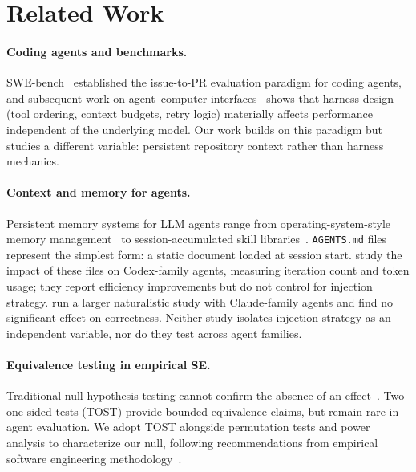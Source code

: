 \documentclass[11pt]{article}
\newcommand{\agentsmd}{\texttt{AGENTS.md}}
\begin{document}
\section{Related Work}

\paragraph{Coding agents and benchmarks.}
SWE-bench~\citep{swebench} established the issue-to-PR evaluation paradigm for coding agents, and subsequent work on agent--computer interfaces~\citep{sweagent} shows that harness design (tool ordering, context budgets, retry logic) materially affects performance independent of the underlying model.
Our work builds on this paradigm but studies a different variable: persistent repository context rather than harness mechanics.

\paragraph{Context and memory for agents.}
Persistent memory systems for LLM agents range from operating-system-style memory management~\citep{memgpt} to session-accumulated skill libraries~\citep{voyager}.
\agentsmd{} files represent the simplest form: a static document loaded at session start.
\citet{paper1} study the impact of these files on Codex-family agents, measuring iteration count and token usage; they report efficiency improvements but do not control for injection strategy.
\citet{paper2} run a larger naturalistic study with Claude-family agents and find no significant effect on correctness.
Neither study isolates injection strategy as an independent variable, nor do they test across agent families.

\paragraph{Equivalence testing in empirical SE.}
Traditional null-hypothesis testing cannot confirm the absence of an effect~\citep{tost}.
Two one-sided tests (TOST) provide bounded equivalence claims, but remain rare in agent evaluation.
We adopt TOST alongside permutation tests and power analysis to characterize our null, following recommendations from empirical software engineering methodology~\citep{empiricalse}.

\end{document}
